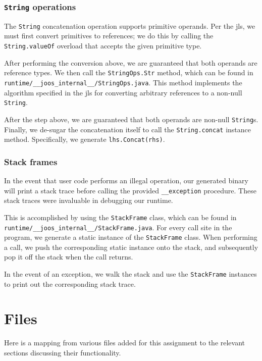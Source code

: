 \documentclass[12pt, titlepage]{article}
\newcommand{\z}[1]{\texttt{#1}}
\begin{document}
\subsubsection{\z{String} operations}\label{subsubsec:strops}
The \z{String} concatenation operation supports primitive operands. Per the
\ac{jls}, we must first convert primitives to references; we do this by calling
the \z{String.valueOf} overload that accepts the given primitive type.

After performing the conversion above, we are guaranteed that both operands are
reference types. We then call the \z{StringOps.Str} method, which can be found
in \z{runtime/\_\_joos\_internal\_\_/StringOps.java}. This method implements
the algorithm specified in the \ac{jls} for converting arbitrary references to
a non-null \z{String}.

After the step above, we are guaranteed that both operands are non-null
\z{String}s. Finally, we de-sugar the concatenation itself to call the
\z{String.concat} instance method. Specifically, we generate
\z{lhs.Concat(rhs)}.

\subsubsection{Stack frames}\label{subsubsec:stacks}
In the event that user code performs an illegal operation, our generated binary
will print a stack trace before calling the provided \z{\_\_exception}
procedure. These stack traces were invaluable in debugging our runtime.

This is accomplished by using the \z{StackFrame} class, which can be found in
\z{runtime/\_\_joos\_internal\_\_/StackFrame.java}. For every call site in the
program, we generate a static instance of the \z{StackFrame} class. When
performing a call, we push the corresponding static instance onto the stack,
and subsequently pop it off the stack when the call returns.

In the event of an exception, we walk the stack and use the \z{StackFrame}
instances to print out the corresponding stack trace.

\section{Files}
Here is a mapping from various files added for this assignment to the relevant
sections discussing their functionality.
\end{document}
